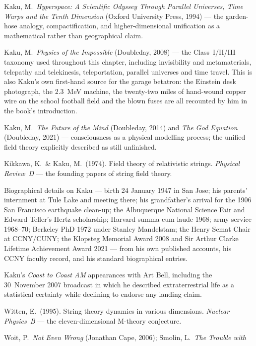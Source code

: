 \begin{srcnotes}
\item Kaku, M.\ \emph{Hyperspace: A Scientific Odyssey Through Parallel Universes, Time Warps and
the Tenth Dimension} (Oxford University Press, 1994) --- the garden-hose analogy, compactification,
and higher-dimensional unification as a mathematical rather than geographical claim.
\item Kaku, M.\ \emph{Physics of the Impossible} (Doubleday, 2008) --- the Class~I/II/III taxonomy
used throughout this chapter, including invisibility and metamaterials, telepathy and telekinesis,
teleportation, parallel universes and time travel. This is also Kaku's own first-hand source for
the garage betatron: the Einstein desk photograph, the 2.3~MeV machine, the twenty-two miles of
hand-wound copper wire on the school football field and the blown fuses are all recounted by him in
the book's introduction.
\item Kaku, M.\ \emph{The Future of the Mind} (Doubleday, 2014) and \emph{The God Equation}
(Doubleday, 2021) --- consciousness as a physical modelling process; the unified field theory
explicitly described as still unfinished.
\item Kikkawa, K.\ \& Kaku, M.\ (1974). Field theory of relativistic strings.
\emph{Physical Review~D} --- the founding papers of string field theory.
\item Biographical details on Kaku --- birth 24 January 1947 in San Jose; his parents' internment
at Tule Lake and meeting there; his grandfather's arrival for the 1906 San Francisco earthquake
clean-up; the Albuquerque National Science Fair and Edward Teller's Hertz
scholarship; Harvard summa cum laude 1968; army service 1968--70; Berkeley PhD 1972 under Stanley
Mandelstam; the Henry Semat Chair at CCNY/CUNY; the Klopsteg Memorial Award 2008 and Sir Arthur
Clarke Lifetime Achievement Award 2021 --- from his own published accounts, his CCNY faculty
record, and his standard biographical entries.
\item Kaku's \emph{Coast to Coast AM} appearances with Art Bell, including the 30~November 2007
broadcast in which he described extraterrestrial life as a statistical certainty while declining
to endorse any landing claim.
\item Witten, E.\ (1995). String theory dynamics in various dimensions. \emph{Nuclear Physics~B}
--- the eleven-dimensional M-theory conjecture.
\item Woit, P.\ \emph{Not Even Wrong} (Jonathan Cape, 2006); Smolin, L.\ \emph{The Trouble with
}
\end{srcnotes}
